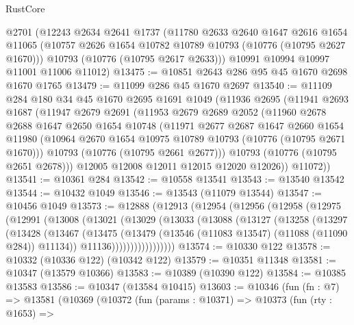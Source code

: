 \begin{lexlean}{RustCore}
\begin{coremodule}
    @2701
    (@12243
      @2634
      @2641
      @1737
      (@11780
        @2633
        @2640
        @1647
        @2616
        @1654
        @11065
        (@10757 @2626 @1654 @10782 @10789 @10793 (@10776 (@10795 @2627 @1670)))
        @10793
        (@10776 (@10795 @2617 @2633)))
      @10991
      @10994
      @10997
      @11001
      @11006
      @11012)
@13475 := @10851 @2643 @286 @95 @45 @1670 @2698 @1670 @1765
@13479 := @11099 @286 @45 @1670 @2697
@13540 := @11109
    @284
    @180
    @34
    @45
    @1670
    @2695
    @1691
    @1049
    (@11936
      @2695
      (@11941
        @2693
        @1687
        (@11947
          @2679
          @2691
          (@11953
            @2679
            @2689
            @2052
            (@11960
              @2678
              @2688
              @1647
              @2650
              @1654
              @10748
              (@11971
                @2677
                @2687
                @1647
                @2660
                @1654
                @11980
                (@10964 @2670 @1654 @10975 @10789 @10793 (@10776 (@10795 @2671 @1670)))
                @10793
                (@10776 (@10795 @2661 @2677)))
              @10793
              (@10776 (@10795 @2651 @2678)))
            @12005
            @12008
            @12011
            @12015
            @12020
            @12026))
        @11072))
@13541 := @10361 @284
@13542 := @10558 @13541
@13543 := @13540 @13542
@13544 := @10432 @1049
@13546 := @13543 (@11079 @13544)
@13547 := @10456 @1049
@13573 := @12888
    (@12913
      (@12954
        (@12956
          (@12958
            (@12975
              (@12991
                (@13008
                  (@13021
                    (@13029
                      (@13033
                        (@13088
                          (@13127
                            (@13258
                              (@13297
                                (@13428
                                  (@13467
                                    (@13475
                                      (@13479
                                        (@13546 (@11083 @13547) (@11088 (@11090 @284)) @11134))
                                      @11136)))))))))))))))))
@13574 := @10330 @122
@13578 := @10332 (@10336 @122) (@10342 @122)
@13579 := @10351 @11348
@13581 := @10347 (@13579 @10366)
@13583 := @10389 (@10390 @122)
@13584 := @10385 @13583
@13586 := @10347 (@13584 @10415)
@13603 := @10346
    (fun (fn : @7) =>
    @13581
      (@10369
        (@10372
          (fun (params : @10371) =>
          @10373
            (fun (rty : @1653) =>

\end{coremodule}
\end{lexlean}
